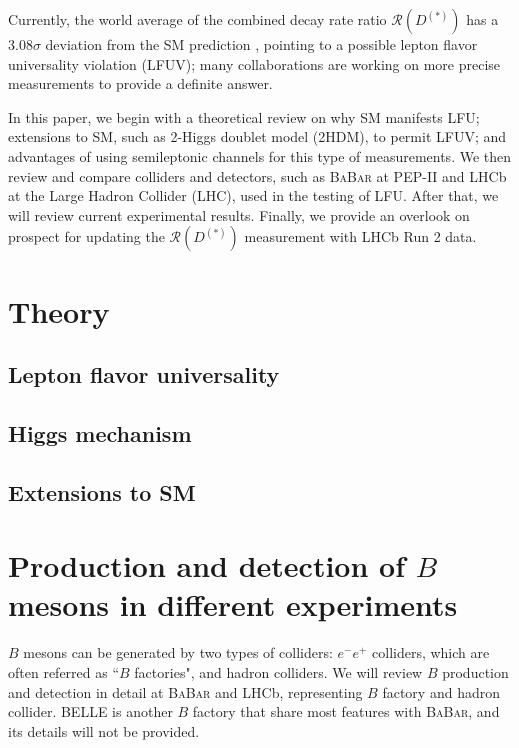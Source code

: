 \documentclass[12pt,letterpaper]{article}
\def\BaBar/{\textsc{BaBar}}
\def\RDDst/{\ensuremath{\mathcal{R}(D^{(*)})}}
\begin{document}
Currently, the world average of the combined decay rate ratio \RDDst/
has a $3.08\sigma$ deviation from the SM prediction \cite{HFLAV:2019}, pointing
to a possible lepton flavor universality violation (LFUV);
many collaborations are working on more precise measurements to provide a
definite answer.

In this paper, we begin with a theoretical review on why SM manifests LFU;
extensions to SM, such as 2-Higgs doublet model (2HDM), to permit LFUV;
and advantages of using semileptonic channels for this type of measurements.
We then review and compare colliders and detectors, such as \BaBar/ at PEP-II
and LHCb at the Large Hadron Collider (LHC), used in the testing of LFU.
After that, we will review current experimental results.
Finally, we provide an overlook on prospect for updating the \RDDst/ measurement with LHCb Run
2 data.

\section{Theory}
\subsection{Lepton flavor universality} \label{sec:lfu}


\subsection{Higgs mechanism}


\subsection{Extensions to SM}


\section{Production and detection of $B$ mesons in different experiments}
$B$ mesons can be generated by two types of colliders:
$e^- e^+$ colliders, which are often referred as ``$B$ factories", and hadron colliders.
We will review $B$ production and detection in detail at \BaBar/ and LHCb, representing $B$ factory and hadron collider.
BELLE is another $B$ factory that share most features with \BaBar/, and its details will not be provided.
\end{document}
